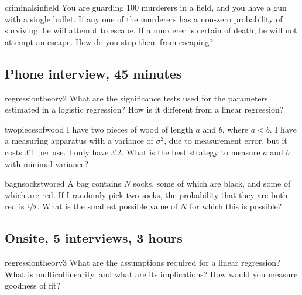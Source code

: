 \documentclass[a4paper]{article}
\begin{document}
\begin{question}{criminalsinfield}
You are guarding 100 murderers in a field, and you have a gun with a single bullet.
If any one of the murderers has a non-zero probability of surviving, he will attempt to escape. If a murderer is certain of death, he will not attempt an escape.
How do you stop them from escaping?
\end{question}

\clearpage





\clearpage
\subsection{Phone interview, 45 minutes}
\begin{question}{regressiontheory2}
What are the significance tests used for the parameters estimated in a logistic regression?
How is it different from a linear regression?
\end{question}


\begin{question}{twopiecesofwood}
I have two pieces of wood of length $a$ and $b$, where $a<b$.
I have a measuring apparatus with a variance of $\sigma^2$, due to measurement error, but it costs \pounds 1 per use.
I only have \pounds2.
What is the best strategy to measure $a$ and $b$ with minimal variance?
\end{question}



\begin{question}{bagnsockstwored}
A bag contains $N$ socks, some of which are black, and some of which are red.
If I randomly pick two socks,
the probability that they are both red is $\nicefrac{1}{2}$.
What is the smallest possible value of $N$ for which this is possible?
\end{question}

\clearpage





\clearpage
\subsection{Onsite, 5 interviews, 3 hours}
\begin{question}{regressiontheory3}
What are the assumptions required for a linear regression?
What is multicollinearity, and what are its implications?
How would you measure goodness of fit?
\end{question}
\end{document}
